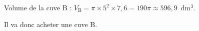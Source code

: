 %
%
% 
% 
% 
 
Volume de la cuve B : $V_{\text{B}} = \pi \times  5^2 \times 7,6 = 190\pi \approx 596,9$~dm$^3$. 

Il va donc acheter une cuve B.
\vspace{0,5cm}

